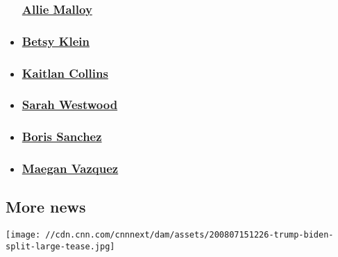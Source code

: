 \begin{itemize}
{  \subsubsection{\texorpdfstring{\href{/profiles/allie-malloy}{Allie
  Malloy}}{Allie Malloy}}\label{allie-malloy}}
\item
  \hypertarget{betsy-klein}{%
  \subsubsection{\texorpdfstring{\href{/profiles/betsy-klein}{Betsy
  Klein}}{Betsy Klein}}\label{betsy-klein}}
\item
  \hypertarget{kaitlan-collins}{%
  \subsubsection{\texorpdfstring{\href{/profiles/kaitlan-collins}{Kaitlan
  Collins}}{Kaitlan Collins}}\label{kaitlan-collins}}
\item
  \hypertarget{sarah-westwood}{%
  \subsubsection{\texorpdfstring{\href{/profiles/sarah-westwood}{Sarah
  Westwood}}{Sarah Westwood}}\label{sarah-westwood}}
\item
  \hypertarget{boris-sanchez}{%
  \subsubsection{\texorpdfstring{\href{/profiles/boris-sanchez-profile}{Boris
  Sanchez}}{Boris Sanchez}}\label{boris-sanchez}}
\item
  \hypertarget{maegan-vazquez}{%
  \subsubsection{\texorpdfstring{\href{/profiles/maegan-vazquez}{Maegan
  Vazquez}}{Maegan Vazquez}}\label{maegan-vazquez}}
\end{itemize}

\hypertarget{more-news-}{%
\subsection{More news~}\label{more-news-}}

\href{/2020/08/08/opinions/trump-fourth-debate-request-zelizer/index.html}{}

\texttt{[image: //cdn.cnn.com/cnnnext/dam/assets/200807151226-trump-biden-split-large-tease.jpg]}


